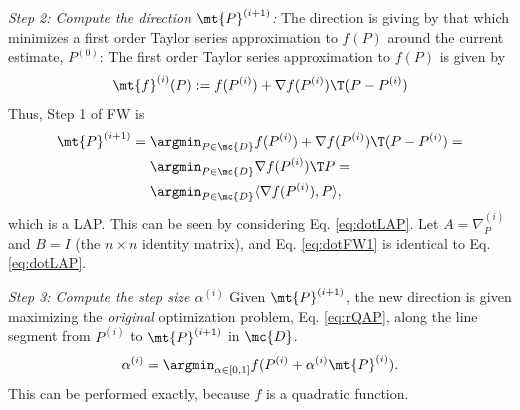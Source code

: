 \documentclass[10pt,journal,cspaper,compsoc]{IEEEtran}
\begin{document}
\emph{Step 2: Compute the direction $\mt{P}^{(i+1)}$:} The direction is giving by that which minimizes a first order Taylor series approximation to $f(P)$ around the current estimate, $P^{(0)}$: The first order Taylor series approximation to $f(P)$ is given by
\begin{align}
	\mt{f}^{(i)}(P) := f(P^{(i)}) + \nabla f(P^{(i)})\T(P - P^{(i)})
\end{align}
Thus, Step 1 of FW is
\begin{subequations} \label{eq:FW1}
\begin{align}
	\mt{P}^{(i+1)} = \argmin_{P \in \mc{D}} &f(P^{(i)}) + \nabla f(P^{(i)})\T(P - P^{(i)}) 
	=\\ \argmin_{P \in \mc{D}} &\nabla f(P^{(i)})\T P 
	= \\ \argmin_{P \in \mc{D}} & \langle \nabla f(P^{(i)}), P \rangle, \label{eq:dotFW1}
\end{align}
\end{subequations}
which is a LAP.  This can be seen by considering Eq. \eqref{eq:dotLAP}.  Let $A=\nabla_P^{(i)}$ and $B=I$ (the $n\times n$ identity matrix), and Eq. \eqref{eq:dotFW1} is identical to Eq. \eqref{eq:dotLAP}.


\emph{Step 3: Compute the step size $\alpha^{(i)}$} Given $\mt{P}^{(i+1)}$, the new direction is given maximizing the \emph{original} optimization problem, Eq. \eqref{eq:rQAP}, along the line segment from $P^{(i)}$ to $\mt{P}^{(i+1)}$ in $\mc{D}$.    
% 
% 
% 
\begin{align}\label{eq:step}
	\alpha^{(i)} = \argmin_{\alpha \in [0,1]} f(P^{(i)} + \alpha^{(i)} \mt{P}^{(i)}).
\end{align}
This can be performed exactly, because $f$ is a quadratic function.  

\end{document}
